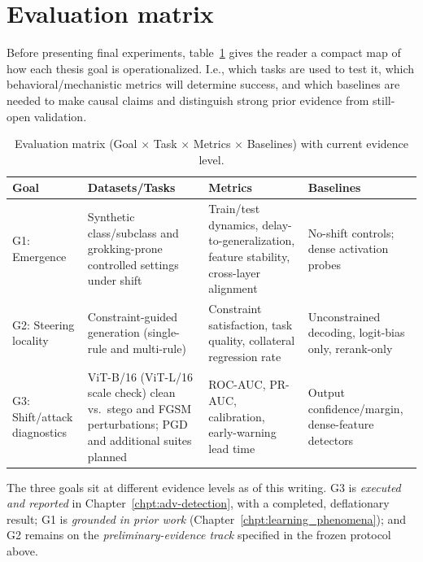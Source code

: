 \documentclass[../ppgc-tese.tex]{subfiles}
\begin{document}
\section{Evaluation matrix}
Before presenting final experiments, table~\ref{tab:evaluation-matrix} gives the reader a compact map of how each thesis goal is operationalized. I.e., which tasks are used to test it, which behavioral/mechanistic metrics will determine success, and which baselines are needed to make causal claims and distinguish strong prior evidence from still-open validation.
\begin{table}[ht]
\centering
\small
\begin{tabular}{p{}p{}p{}p{}}
\hline
\textbf{Goal} & \textbf{Datasets/Tasks} & \textbf{Metrics} & \textbf{Baselines} \\
\hline
G1: Emergence &
Synthetic class/subclass and grokking-prone controlled settings under shift &
Train/test dynamics, delay-to-generalization, feature stability, cross-layer alignment &
No-shift controls; dense activation probes  \\

G2: Steering locality &
Constraint-guided generation (single-rule and multi-rule) &
Constraint satisfaction, task quality, collateral regression rate &
Unconstrained decoding, logit-bias only, rerank-only \\

G3: Shift/attack diagnostics &
ViT-B/16 (ViT-L/16 scale check) clean vs.\ stego and FGSM perturbations; PGD and additional suites planned &
ROC-AUC, PR-AUC, calibration, early-warning lead time &
Output confidence/margin, dense-feature detectors \\
\hline
\end{tabular}
\caption{Evaluation matrix (Goal $\times$ Task $\times$ Metrics $\times$ Baselines) with current evidence level.}
\label{tab:evaluation-matrix}
\end{table}

The three goals sit at different evidence levels as of this writing. G3 is
\emph{executed and reported} in Chapter~\ref{chpt:adv-detection}, with a completed,
deflationary result; G1 is \emph{grounded in prior work}
(Chapter~\ref{chpt:learning_phenomena}); and G2 remains on the
\emph{preliminary-evidence track} specified in the frozen protocol above.
\end{document}
